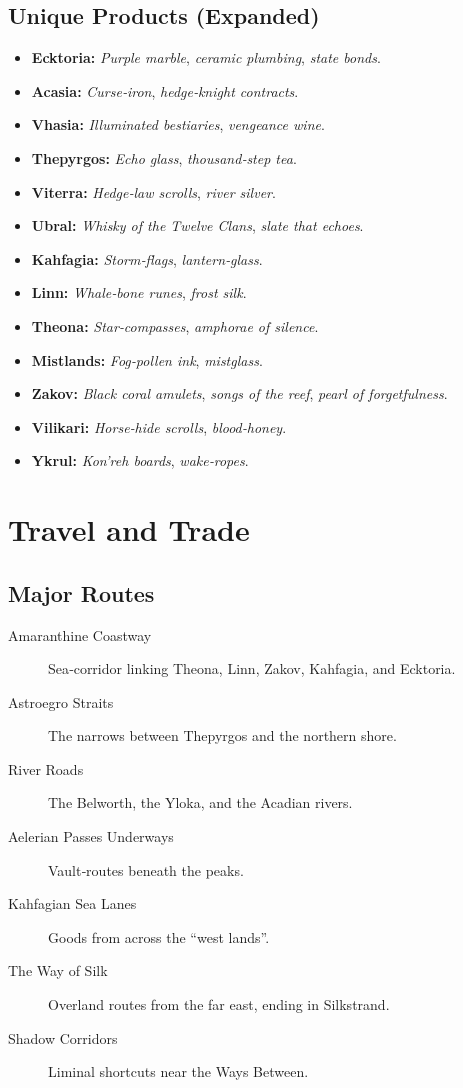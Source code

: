 \subsection*{Unique Products (Expanded)}
\label{subsec:unique-products}
\begin{itemize}
\item \textbf{Ecktoria:} \emph{Purple marble}, \emph{ceramic plumbing}, \emph{state bonds}.
\item \textbf{Acasia:} \emph{Curse‑iron}, \emph{hedge‑knight contracts}.
\item \textbf{Vhasia:} \emph{Illuminated bestiaries}, \emph{vengeance wine}.
\item \textbf{Thepyrgos:} \emph{Echo glass}, \emph{thousand‑step tea}.
\item \textbf{Viterra:} \emph{Hedge‑law scrolls}, \emph{river silver}.
\item \textbf{Ubral:} \emph{Whisky of the Twelve Clans}, \emph{slate that echoes}.
\item \textbf{Kahfagia:} \emph{Storm‑flags}, \emph{lantern‑glass}.
\item \textbf{Linn:} \emph{Whale‑bone runes}, \emph{frost silk}.
\item \textbf{Theona:} \emph{Star‑compasses}, \emph{amphorae of silence}.
\item \textbf{Mistlands:} \emph{Fog‑pollen ink}, \emph{mistglass}.
\item \textbf{Zakov:} \emph{Black coral amulets}, \emph{songs of the reef}, \emph{pearl of forgetfulness}.
\item \textbf{Vilikari:} \emph{Horse‑hide scrolls}, \emph{blood‑honey}.
\item \textbf{Ykrul:} \emph{Kon'reh boards}, \emph{wake‑ropes}.
\end{itemize}

\section{Travel and Trade}
\label{sec:travel-trade}

\subsection*{Major Routes}
\label{subsec:major-routes}
\begin{description}
\item[Amaranthine Coastway] Sea‑corridor linking Theona, Linn, Zakov, Kahfagia, and Ecktoria.
\item[Astroegro Straits] The narrows between Thepyrgos and the northern shore.
\item[River Roads] The Belworth, the Yloka, and the Acadian rivers.
\item[Aelerian Passes Underways] Vault‑routes beneath the peaks.
\item[Kahfagian Sea Lanes] Goods from across the “west lands”.
\item[The Way of Silk] Overland routes from the far east, ending in Silkstrand.
\item[Shadow Corridors] Liminal shortcuts near the Ways Between.
\end{description}

